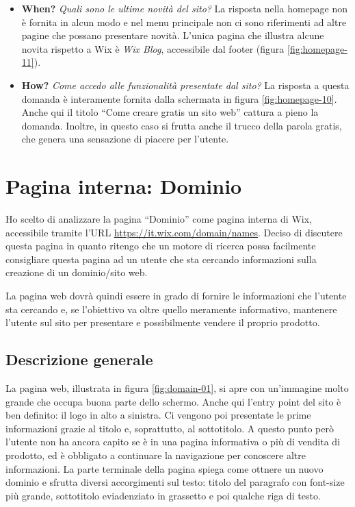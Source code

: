 \documentclass[11pt,a4paper]{article}
\newcommand*{\wix}{Wix}
\begin{document}
\begin{itemize}
  \item \textbf{When?} \textit{Quali sono le ultime novità del sito?}
    La risposta nella homepage non è fornita in alcun modo e nel menu
    principale non ci sono riferimenti ad altre pagine che possano
    presentare novità. L'unica pagina che illustra alcune novita
    rispetto a \wix{} è \textit{Wix Blog}, accessibile dal footer
    (figura \ref{fig:homepage-11}).

  \item \textbf{How?} \textit{Come accedo alle funzionalità presentate
    dal sito?} La risposta a questa domanda è interamente fornita
    dalla schermata in figura \ref{fig:homepage-10}. Anche qui il
    titolo ``Come creare gratis un sito web'' cattura a pieno la
    domanda. Inoltre, in questo caso si frutta anche il trucco della
    parola gratis, che genera una sensazione di piacere per l'utente.  
\end{itemize}

\section{Pagina interna: Dominio}
\label{sec:secondary-page-analysis}

Ho scelto di analizzare la pagina ``Dominio'' come pagina interna di
\wix{}, accessibile tramite l'URL
\url{https://it.wix.com/domain/names}. Deciso di discutere questa
pagina in quanto ritengo che un motore di ricerca possa facilmente
consigliare questa pagina ad un utente che sta cercando informazioni
sulla creazione di un dominio/sito web.

La pagina web dovrà quindi essere in grado di fornire le informazioni
che l'utente sta cercando e, se l'obiettivo va oltre quello meramente
informativo, mantenere l'utente sul sito per presentare e possibilmente
vendere il proprio prodotto.

\subsection{Descrizione generale}
\label{subsec:internalpage-description}

La pagina web, illustrata in figura \ref{fig:domain-01}, si apre con
un'immagine molto grande che occupa buona parte dello schermo. Anche
qui l'entry point del sito è ben definito: il logo in alto a
sinistra. Ci vengono poi presentate le prime informazioni grazie al
titolo e, soprattutto, al sottotitolo. A questo punto però l'utente
non ha ancora capito se è in una pagina informativa o più di vendita
di prodotto, ed è obbligato a continuare la navigazione per conoscere
altre informazioni. La parte terminale della pagina spiega come
ottnere un nuovo dominio e sfrutta diversi accorgimenti sul testo:
titolo del paragrafo con font-size più grande, sottotitolo
eviadenziato in grassetto e poi qualche riga di testo.
\end{document}

